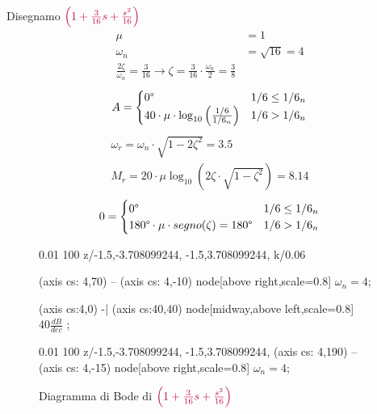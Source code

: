 \documentclass[a4paper]{article}
\begin{document}
\begin{example}
    \vspace{1em}
    \noindent
    Disegnamo \( \color{purple} \left( 1 + \frac{3}{16}s + \frac{s ^2}{16} \right)  \) 
    \[
    \begin{aligned}
      \mu &= 1\\
      \omega_n &= \sqrt{16} = 4\\
      \frac{2 \zeta}{\omega_n} = \frac{3}{16} \to \zeta = \frac{3}{16} \cdot \frac{\omega_n}{2} = \frac{3}{8}
    \end{aligned}
    \] 
    \[
    \begin{aligned}
      A &= \begin{cases}
        0\degree & 1/6 \le 1/6_n\\
        40 \cdot \mu \cdot \log_{10} \left( \frac{1/6}{1/6_n} \right) & 1/6 > 1/6_n
      \end{cases}\\
    \end{aligned}
    \] 
    \[
      \begin{aligned}
        \omega_r = \omega_n \cdot \sqrt{1 - 2 \zeta^2} = 3.5\\
        M_r = 20 \cdot \mu \log_{10} \left( 2 \zeta \cdot \sqrt{1 - \zeta^2} \right) = 8.14
      \end{aligned}
    \] 
    \[
    0 = \begin{cases}
      0\degree & 1/6 \le 1/6_n\\
      180\degree \cdot \mu \cdot segno(\zeta) = 180\degree & 1/6 > 1/6_n
    \end{cases}
    \] 
    \begin{figure}[H]
      \centering
      \begin{BodeMagPlot}[scale=1.5,ytick distance=20,ylabel={Ampiezza (dB)},xlabel={}] {0.01} {100}
        {
          z/{{-1.5,-3.708099244}, {-1.5,3.708099244}},
          k/0.06
        }

         (axis cs: 4,70) -- (axis cs: 4,-10) node[above right,scale=0.8] {\( \omega_n = 4 \)};

         (axis cs:4,0) -| (axis cs:40,40) 
        node[midway,above left,scale=0.8] {\( 40 \frac{dB}{dec} \) };
      \end{BodeMagPlot}

      \begin{BodePhPlot}[
        scale=1.5,ytick distance=90,ylabel={Fase (deg)},xlabel={Frequenza (rad/s)},
        ] {0.01} {100}
        {
          z/{{-1.5,-3.708099244}, {-1.5,3.708099244}},
        }
         (axis cs: 4,190) -- (axis cs: 4,-15) node[above right,scale=0.8] {\( \omega_n = 4 \)};
      \end{BodePhPlot}
      \caption{Diagramma di Bode di 
      \( \color{purple} \left( 1 + \frac{3}{16}s + \frac{s ^2}{16} \right)  \)}
    \end{figure}


\end{example}
\end{document}
